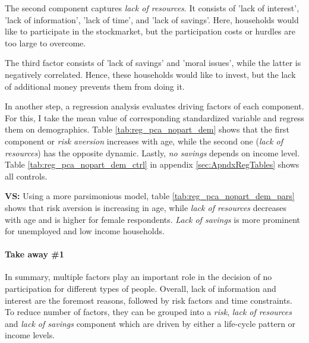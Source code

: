 \documentclass[ProjectABM]{subfiles}
\begin{document}
The second component captures \textit{lack of resources}. It consists of 'lack of interest', 'lack of information', 'lack of time', and 'lack of savings'. Here, households would like to participate in the stockmarket, but the participation costs or hurdles are too large to overcome.

The third factor consists of 'lack of savings' and 'moral issues', while the latter is negatively correlated. Hence, these households would like to invest, but the lack of additional money prevents them from doing it.



In another step, a regression analysis evaluates driving factors of each component. For this, I take the mean value of corresponding standardized variable and regress them on demographics. Table \ref{tab:reg_pca_nopart_dem} shows that the first component or \textit{risk aversion} increases with age, while the second one (\textit{lack of resources}) has the opposite dynamic. Lastly, \textit{no savings} depends on income level. Table \ref{tab:reg_pca_nopart_dem_ctrl} in appendix \ref{sec:ApndxRegTables} shows all controls.



\textbf{VS:} Using a more parsimonious model, table \ref{tab:reg_pca_nopart_dem_pars} shows that risk aversion is increasing in age, while \textit{lack of resources} decreases with age and is higher for female respondents. \textit{Lack of savings} is more prominent for unemployed and low income households.




\paragraph{Take away \#1}
In summary, multiple factors play an important role in the decision of no participation for different types of people. Overall, lack of information and interest are the foremost reasons, followed by risk factors and time constraints. To reduce number of factors, they can be grouped into a \textit{risk}, \textit{lack of resources} and \textit{lack of savings} component which are driven by either a life-cycle pattern or income levels. %
\end{document}
